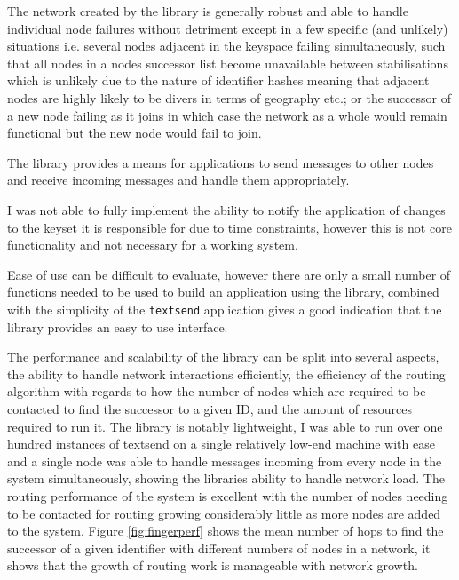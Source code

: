 \documentclass{article}
\begin{document}
The network created by the library is generally robust and able to handle individual node failures without detriment except in a few specific (and unlikely) situations i.e. several nodes adjacent in the keyspace failing simultaneously, such that all nodes in a nodes successor list become unavailable between stabilisations which is unlikely due to the nature of identifier hashes meaning that adjacent nodes are highly likely to be divers in terms of geography etc.; or the successor of a new node failing as it joins in which case the network as a whole would remain functional but the new node would fail to join.

The library provides a means for applications to send messages to other nodes and receive incoming messages and handle them appropriately.

I was not able to fully implement the ability to notify the application of changes to the keyset it is responsible for due to time constraints, however this is not core functionality and not necessary for a working system.


Ease of use can be difficult to evaluate, however there are only a small number of functions needed to be used to build an application using the library, combined with the simplicity of the \texttt{textsend} application gives a good indication that the library provides an easy to use interface.

The performance and scalability of the library can be split into several aspects, the ability to handle network interactions efficiently, the efficiency of the routing algorithm with regards to how the number of nodes which are required to be contacted to find the successor to a given ID, and the amount of resources required to run it.
The library is notably lightweight, I was able to run over one hundred instances of textsend on a single relatively low-end machine with ease and a single node was able to handle messages incoming from every node in the system simultaneously, showing the libraries ability to handle network load.
The routing performance of the system is excellent with the number of nodes needing to be contacted for routing growing considerably little as more nodes are added to the system.
Figure \ref{fig:fingerperf} shows the mean number of hops to find the successor of a given identifier with different numbers of nodes in a network, it shows that the growth of routing work is manageable with network growth.
\end{document}
